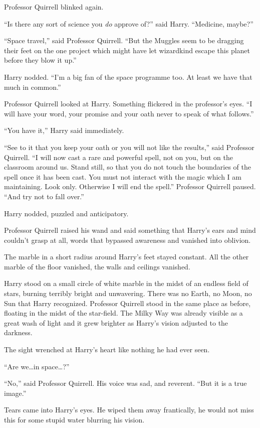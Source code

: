 Professor Quirrell blinked again.

“Is there any sort of science you \emph{do} approve of?” said Harry. “Medicine, maybe?”

“Space travel,” said Professor Quirrell. “But the Muggles seem to be dragging their feet on the one project which might have let wizardkind escape this planet before they blow it up.”

Harry nodded. “I’m a big fan of the space programme too. At least we have that much in common.”

Professor Quirrell looked at Harry. Something flickered in the professor’s eyes. “I will have your word, your promise and your oath never to speak of what follows.”

“You have it,” Harry said immediately.

“See to it that you keep your oath or you will not like the results,” said Professor Quirrell. “I will now cast a rare and powerful spell, not on you, but on the classroom around us. Stand still, so that you do not touch the boundaries of the spell once it has been cast. You must not interact with the magic which I am maintaining. Look only. Otherwise I will end the spell.” Professor Quirrell paused. “And try not to fall over.”

Harry nodded, puzzled and anticipatory.

Professor Quirrell raised his wand and said something that Harry’s ears and mind couldn’t grasp at all, words that bypassed awareness and vanished into oblivion.

The marble in a short radius around Harry’s feet stayed constant. All the other marble of the floor vanished, the walls and ceilings vanished.

Harry stood on a small circle of white marble in the midst of an endless field of stars, burning terribly bright and unwavering. There was no Earth, no Moon, no Sun that Harry recognized. Professor Quirrell stood in the same place as before, floating in the midst of the star-field. The Milky Way was already visible as a great wash of light and it grew brighter as Harry’s vision adjusted to the darkness.

The sight wrenched at Harry’s heart like nothing he had ever seen.

“Are we…in space…?”

“No,” said Professor Quirrell. His voice was sad, and reverent. “But it is a true image.”

Tears came into Harry’s eyes. He wiped them away frantically, he would not miss this for some stupid water blurring his vision.

